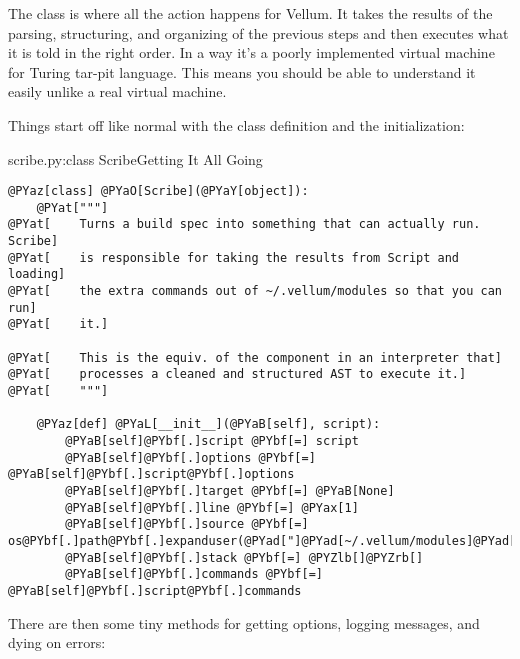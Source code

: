 The  class is where all the action happens for Vellum.  It takes
the results of the parsing, structuring, and organizing of the previous steps
and then executes what it is told in the right order.  In a way it's a poorly
implemented virtual machine for Turing tar-pit language.  This means you should
be able to understand it easily unlike a real virtual machine.

Things start off like normal with the class definition and the initialization:

\begin{code}{scribe.py:class Scribe}{Getting It All Going}
\begin{Verbatim}[commandchars=@\[\]]
@PYaz[class] @PYaO[Scribe](@PYaY[object]):
    @PYat["""]
@PYat[    Turns a build spec into something that can actually run.  Scribe]
@PYat[    is responsible for taking the results from Script and loading]
@PYat[    the extra commands out of ~/.vellum/modules so that you can run]
@PYat[    it.]

@PYat[    This is the equiv. of the component in an interpreter that]
@PYat[    processes a cleaned and structured AST to execute it.]
@PYat[    """]

    @PYaz[def] @PYaL[__init__](@PYaB[self], script):
        @PYaB[self]@PYbf[.]script @PYbf[=] script
        @PYaB[self]@PYbf[.]options @PYbf[=] @PYaB[self]@PYbf[.]script@PYbf[.]options
        @PYaB[self]@PYbf[.]target @PYbf[=] @PYaB[None]
        @PYaB[self]@PYbf[.]line @PYbf[=] @PYax[1]
        @PYaB[self]@PYbf[.]source @PYbf[=] os@PYbf[.]path@PYbf[.]expanduser(@PYad["]@PYad[~/.vellum/modules]@PYad["])
        @PYaB[self]@PYbf[.]stack @PYbf[=] @PYZlb[]@PYZrb[]
        @PYaB[self]@PYbf[.]commands @PYbf[=] @PYaB[self]@PYbf[.]script@PYbf[.]commands
\end{Verbatim}

\end{code}

There are then some tiny methods for getting options, logging messages, and
dying on errors:

